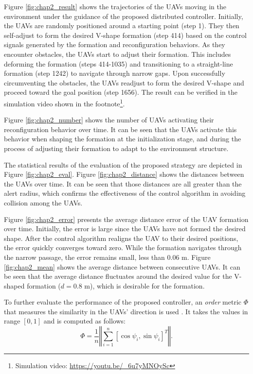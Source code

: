 Figure \ref{fig:chap2_result} shows the trajectories of the UAVs moving in the environment under the guidance of the proposed distributed controller. Initially, the UAVs are randomly positioned around a starting point (step 1). They then self-adjust to form the desired V-shape formation (step 414) based on the control signals generated by the formation and reconfiguration behaviors. As they encounter obstacles, the UAVs start to adjust their formation. This includes deforming the formation (steps 414-1035) and transitioning to a straight-line formation (step 1242) to navigate through narrow gaps. Upon successfully circumventing the obstacles, the UAVs readjust to form the desired V-shape and proceed toward the goal position (step 1656). The result can be verified in the simulation video shown in the footnote\footnote{Simulation video: {\selectfont
\url{https://youtu.be/_6u7yMNOySc}}}. 

Figure \ref{fig:chap2_number} shows the number of UAVs activating their reconfiguration behavior over time. It can be seen that the UAVs activate this behavior when shaping the formation at the initialization stage, and during the process of adjusting their formation to adapt to the environment structure.

The statistical results of the evaluation of the proposed strategy are depicted in Figure \ref{fig:chap2_eval}. Figure \ref{fig:chap2_distance} shows the distances between the UAVs over time. It can be seen that those distances are all greater than the alert radius, which confirms the effectiveness of the control algorithm in avoiding collision among the UAVs.

Figure \ref{fig:chap2_error} presents the average distance error of the UAV formation over time. Initially, the error is large since the UAVs have not formed the desired shape. After the control algorithm realigns the UAV to their desired positions, the error quickly converges toward zero. While the formation navigates through the narrow passage, the error remains small, less than $0.06$ m. Figure \ref{fig:chap2_mean} shows the average distance between consecutive UAVs. It can be seen that the average distance fluctuates around the desired value for the V-shaped formation ($d=0.8$ m), which is desirable for the formation.

To further evaluate the performance of the proposed controller, an \textit{order} metric $\Phi$ that measures the similarity in the UAVs' direction is used \cite{Vicsek1995}. It takes the values in range $[0, 1]$ and is computed as follows:
\begin{equation}
    \Phi=\dfrac{1}{n}\left\Vert\sum_{i=1}^n{\left[\cos\psi_i, \sin\psi_i\right]^T}\right\Vert.
    \label{eq:order}
\end{equation}

